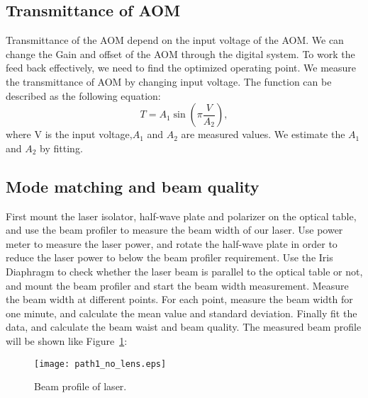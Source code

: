 \subsection{Transmittance of AOM}
Transmittance of the AOM depend on the input voltage of the AOM. We can change the Gain and offset of the AOM through the digital system. To work the feed back effectively, we need to find the optimized operating point. We measure the transmittance of AOM by changing input voltage. The function can be described as the following equation:
\begin{equation}
T=A_1 \sin{\left( \pi \frac{V}{A_2}\right)},
\end{equation}
where V is the input voltage,$ A_1$ and $A_2$ are measured values. We estimate the $A_1$ and $A_2$ by fitting.
			\begin{center}
                                                   \end{center}

\subsection{Mode matching and beam quality}
First mount the laser isolator, half-wave plate and polarizer on the optical table, and use the \underline{\qquad\qquad} beam profiler to measure the beam width of our laser. Use power meter to measure the laser power, and rotate the half-wave plate in order to reduce the laser power to below the beam profiler requirement. Use the Iris Diaphragm to check whether the laser beam is parallel to the optical table or not, and mount the beam profiler and start the beam width measurement. Measure the beam width at different points. For each point, measure the beam width for one minute, and calculate the mean value and standard deviation. Finally fit the data, and calculate the beam waist and beam quality. The measured beam profile will be shown like Figure~\ref{fig:beam_profile}:

\begin{figure}
	\begin{center}
		\texttt{[image: path1\_no\_lens.eps]}
		\caption{Beam profile of laser.} 
		\label{fig:beam_profile} 
	\end{center}
\end{figure}

